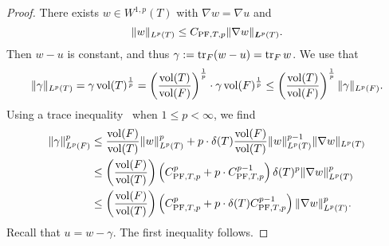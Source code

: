 \documentclass[10pt,a4paper]{article}
\begin{document}
\begin{proof}
    There exists $w \in W^{1,p}(T)$ with $\nabla w = \nabla u$ and 
    \[
        \| w \|_{L^{p}(T)}
        \leq 
        C_{{\rm PF},T,p} 
        \| \nabla w \|_{\bm{L}^{p}(T)}
        .
    \]
    Then $w-u$ is constant, and thus $\gamma := \operatorname{tr}_{F} (w-u) = \operatorname{tr}_{F} w$. 
    We use that 
    \[
        \| \gamma \|_{L^{p}(T)}
        =
        \gamma \operatorname{vol}(T)^\frac{1}{p}
        =
        \left( \frac{ \operatorname{vol}(T) }{ \operatorname{vol}(F) } \right)^\frac{1}{p}
        \cdot 
        \gamma 
        \operatorname{vol}(F)^\frac{1}{p}
        \leq 
        \left( \frac{ \operatorname{vol}(T) }{ \operatorname{vol}(F) } \right)^\frac{1}{p}
        \| \gamma \|_{L^{p}(F)}
        .
    \]
    Using a trace inequality~\cite[Lemma~2.8]{veeser2012poincare} when $1 \leq p < \infty$, we find 
    \begin{align*}
        \| \gamma \|_{L^{p}(F)}^{p}
        &
        \leq 
        \frac{ \operatorname{vol}(F) }{ \operatorname{vol}(T) }
        \| w \|_{L^{p}(T)}^{p}
        +
        p
        \cdot 
        {\delta}(T)
        \frac{ \operatorname{vol}(F) }{ \operatorname{vol}(T) }
        \| w \|_{L^{p}(T)}^{p-1}
        \| \nabla w \|_{L^{p}(T)}
        \\&
        \leq 
        \left( \frac{ \operatorname{vol}(F) }{ \operatorname{vol}(T) } \right)
        \left( C_{{\rm PF},T,p}^{p} + p \cdot C_{{\rm PF},T,p}^{p-1} \right) 
        {\delta}(T)^{p}
        \| \nabla w \|_{L^{p}(T)}^{p}
        \\&
        \leq 
        \left( \frac{ \operatorname{vol}(F) }{ \operatorname{vol}(T) } \right)
        \left( C_{{\rm PF},T,p}^{p} + p \cdot {\delta}(T) C_{{\rm PF},T,p}^{p-1} \right) 
        \| \nabla w \|_{L^{p}(T)}^{p}
        .
    \end{align*}
    Recall that $u = w - \gamma$. The first inequality follows. 
    

\end{proof}
\end{document}
